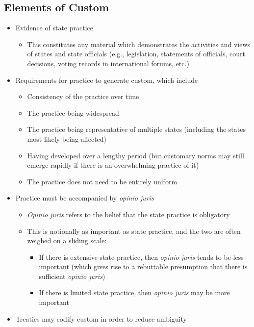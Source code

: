 \subsection{Elements of Custom}
\begin{itemize}
    \item Evidence of state practice
    \begin{itemize}
        \item This constitutes any material which demonstrates the activities and views of states and state officials (e.g., legislation, statements of officials, court decisions, voting records in international forums, etc.)
    \end{itemize}
    \item Requirements for practice to generate custom, which include
    \begin{itemize}
        \item Consistency of the practice over time
        \item The practice being widespread
        \item The practice being representative of multiple states (including the states most likely being affected)
        \item Having developed over a lengthy period (but customary norms may still emerge rapidly if there is an overwhelming practice of it)
        \item The practice does not need to be entirely uniform
    \end{itemize}
    \item Practice must be accompanied by \textit{opinio juris}
    \begin{itemize}
        \item \textit{Opinio juris} refers to the belief that the state practice is obligatory
        \item This is notionally as important as state practice, and the two are often weighed on a sliding scale:
        \begin{itemize}
            \item If there is extensive state practice, then \textit{opinio juris} tends to be less important (which gives rise to a rebuttable presumption that there is sufficient \textit{opinio juris})
            \item If there is limited state practice, then \textit{opinio juris} may be more important
        \end{itemize}
    \end{itemize}
    \item Treaties may codify custom in order to reduce ambiguity
\end{itemize}

